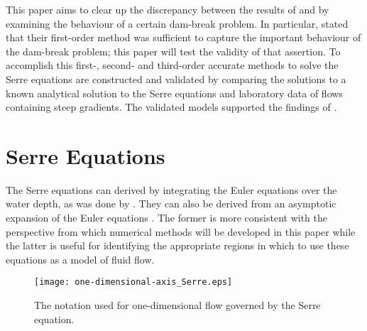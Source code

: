 \documentclass[SingleSpace,12pt,Proceedings]{Serre_ASCE}
\begin{document}
This paper aims to clear up the discrepancy between the results of  and  by examining the behaviour of a certain dam-break problem. In particular,  stated that their first-order method was sufficient to capture the important behaviour of the dam-break problem; this paper will test the validity of that assertion. To accomplish this first-, second- and third-order accurate methods to solve the Serre equations are constructed and validated by comparing the solutions to a known analytical solution to the Serre equations and laboratory data of flows containing steep gradients. The validated models supported the findings of . 

\section{Serre Equations}
\label{section:Serre Equations}
The Serre equations can derived by integrating the Euler equations over the water depth, as was done by . They can also be derived from an asymptotic expansion of the Euler equations \cite{Bonneton-Lannes-2009-16601}. The former is more consistent with the perspective from which numerical methods will be developed in this paper while the latter is useful for identifying the appropriate regions in which to use these equations as a model of fluid flow.
\begin{figure}
\begin{center}
\texttt{[image: one-dimensional-axis\_Serre.eps]}
\end{center}
\caption{The notation used for one-dimensional flow governed by the Serre equation.}
\label{fig:Notation}
\end{figure}
\end{document}
